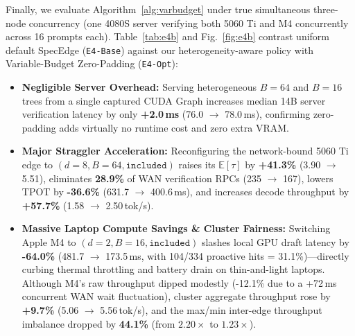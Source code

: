 \documentclass[10pt,conference]{IEEEtran}
\begin{document}
Finally, we evaluate Algorithm~\ref{alg:varbudget} under true simultaneous three-node concurrency (one 4080S server verifying both 5060 Ti and M4 concurrently across 16 prompts each). Table~\ref{tab:e4b} and Fig.~\ref{fig:e4b} contrast uniform default SpecEdge (\texttt{E4-Base}) against our heterogeneity-aware policy with Variable-Budget Zero-Padding (\texttt{E4-Opt}):
\begin{itemize}
  \item \textbf{Negligible Server Overhead:} Serving heterogeneous $B{=}64$ and $B{=}16$ trees from a single captured CUDA Graph increases median 14B server verification latency by only \textbf{+2.0\,ms} (76.0 $\to$ 78.0\,ms), confirming zero-padding adds virtually no runtime cost and zero extra VRAM.
  \item \textbf{Major Straggler Acceleration:} Reconfiguring the network-bound 5060 Ti edge to $(d{=}8, B{=}64, \texttt{included})$ raises its $\mathbb{E}[\tau]$ by \textbf{+41.3\%} (3.90 $\to$ 5.51), eliminates \textbf{28.9\%} of WAN verification RPCs (235 $\to$ 167), lowers TPOT by \textbf{-36.6\%} (631.7 $\to$ 400.6\,ms), and increases decode throughput by \textbf{+57.7\%} (1.58 $\to$ 2.50\,tok/s).
  \item \textbf{Massive Laptop Compute Savings \& Cluster Fairness:} Switching Apple M4 to $(d{=}2, B{=}16, \texttt{included})$ slashes local GPU draft latency by \textbf{-64.0\%} (481.7 $\to$ 173.5\,ms, with 104/334 proactive hits = 31.1\%)---directly curbing thermal throttling and battery drain on thin-and-light laptops. Although M4's raw throughput dipped modestly (-12.1\% due to a +72\,ms concurrent WAN wait fluctuation), cluster aggregate throughput rose by \textbf{+9.7\%} (5.06 $\to$ 5.56\,tok/s), and the max/min inter-edge throughput imbalance dropped by \textbf{44.1\%} (from $2.20\times$ to $1.23\times$).
\end{itemize}
\end{document}
